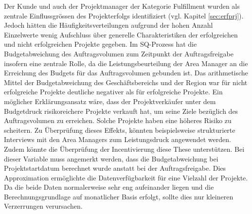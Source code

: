 \newline
Der Kunde und auch der Projektmanager der Kategorie Fulfillment wurden als zentrale Einflussgrössen des Projekterfolgs identifiziert (vgl. Kapitel \ref{sec:erfprj}). Jedoch hätten die Häufigkeitsverteilungen aufgrund der hohen Anzahl Einzelwerte wenig Aufschluss über generelle Charakteristiken der erfolgreichen und nicht erfolgreichen Projekte gegeben.
\newline\newline
Im SQ-Prozess hat die Budgetabweichung des Auftragsvolumen zum Zeitpunkt der Auftragsfreigabe insofern eine zentrale Rolle, da die Leistungsbeurteilung der Area Manager an die Erreichung des Budgets für das Auftragsvolumen gebunden ist. Das arithmetische Mittel der Budgetabweichung des Geschäftsbereichs und der Region war für nicht erfolgreiche Projekte deutliche negativer als für erfolgreiche Projekte. Ein möglicher Erklärungsansatz wäre, dass der Projektverkäufer unter dem Budgetdruck risikoreichere Projekte verkauft hat, um seine Ziele bezüglich des Auftragsvolumen zu erreichen. Solche Projekte haben eine höheres Risiko zu scheitern. Zu Überprüfung dieses Effekts, könnten beispielsweise strukturierte Interviews mit den Area Managers zum Leistungsdruck angewendet werden. Zudem könnte die Überprüfung der Incentivierung diese These unterstützen.  Bei dieser Variable muss angemerkt werden, dass die Budgetabweichung bei Projektstartdatum berechnet wurde anstatt bei der Auftragsfreigabe. Dies Approximation ermöglichte die Datenverfügbarkeit für eine Vielzahl der Projekte. Da die beide Daten normalerweise sehr eng aufeinander liegen und die Berechnungsgrundlage auf monatlicher Basis erfolgt, sollte dies nur kleineren Verzerrungen verursachen.
\newline\newline
